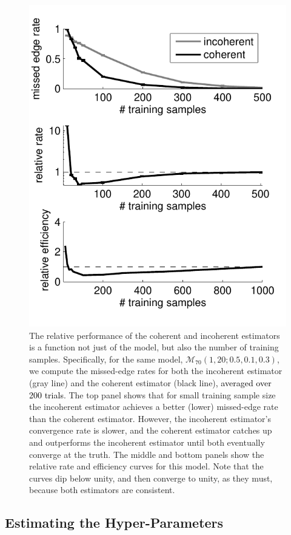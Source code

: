 \documentclass[10pt,journal,cspaper,compsoc]{IEEEtran}
\providecommand{\tk}[1]{\textcolor{black}{#1}}
\providecommand{\mc}[1]{\mathcal{#1}}
\begin{document}
\begin{figure}[htbp]
	\centering
		\includegraphics[width=0.8\linewidth]{../figs/RE_V70_s20_p10_q30.pdf}
	\caption{The relative performance of the coherent and incoherent estimators is a function not just of the model, but also the number of training samples.  Specifically, for the same model, $\mc{M}_{70}(1,20;0.5,0.1,0.3)$, we compute the missed-edge rates for both the incoherent estimator (gray line) and the coherent estimator (black line)\tk{, averaged over 200 trials}.  The top panel shows that for small training sample size the incoherent estimator achieves a better (lower) missed-edge rate than the coherent estimator. However, the incoherent estimator's convergence rate is slower, and the coherent estimator catches up and outperforms the incoherent estimator until both eventually converge at the truth.  The middle and bottom panels show the relative rate and efficiency curves for this model. Note that the curves dip below unity, and then converge to unity, as they must, because both estimators are consistent. }
	\label{fig:RE}
\end{figure}


\subsection{Estimating the Hyper-Parameters} %
\label{sub:estimating_the_hyper_parameters}
\end{document}

